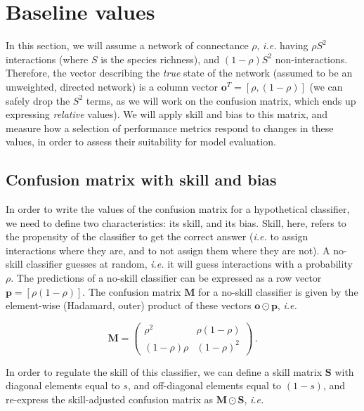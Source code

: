 \documentclass[11pt]{article}
\begin{document}
\hypertarget{baseline-values}{%
\section{Baseline values}\label{baseline-values}}

In this section, we will assume a network of connectance \(\rho\),
\emph{i.e.} having \(\rho S^2\) interactions (where \(S\) is the species
richness), and \((1-\rho) S^2\) non-interactions. Therefore, the vector
describing the \emph{true} state of the network (assumed to be an
unweighted, directed network) is a column vector
\(\mathbf{o}^T = [\rho, (1-\rho)]\) (we can safely drop the \(S^2\)
terms, as we will work on the confusion matrix, which ends up expressing
\emph{relative} values). We will apply skill and bias to this matrix,
and measure how a selection of performance metrics respond to changes in
these values, in order to assess their suitability for model evaluation.

\hypertarget{confusion-matrix-with-skill-and-bias}{%
\subsection{Confusion matrix with skill and
bias}\label{confusion-matrix-with-skill-and-bias}}

In order to write the values of the confusion matrix for a hypothetical
classifier, we need to define two characteristics: its skill, and its
bias. Skill, here, refers to the propensity of the classifier to get the
correct answer (\emph{i.e.} to assign interactions where they are, and
to not assign them where they are not). A no-skill classifier guesses at
random, \emph{i.e.} it will guess interactions with a probability
\(\rho\). The predictions of a no-skill classifier can be expressed as a
row vector \(\mathbf{p} = [\rho (1-\rho)]\). The confusion matrix
\(\mathbf{M}\) for a no-skill classifier is given by the element-wise
(Hadamard, outer) product of these vectors
\(\mathbf{o} \odot \mathbf{p}\), \emph{i.e.}

\[
\mathbf{M} = \begin{pmatrix}
    \rho^2 & \rho (1-\rho) \\
    (1-\rho) \rho & (1-\rho)^2
\end{pmatrix} \,.
\]

In order to regulate the skill of this classifier, we can define a skill
matrix \(\mathbf{S}\) with diagonal elements equal to \(s\), and
off-diagonal elements equal to \((1-s)\), and re-express the
skill-adjusted confusion matrix as \(\mathbf{M} \odot \mathbf{S}\),
\emph{i.e.}
\end{document}
